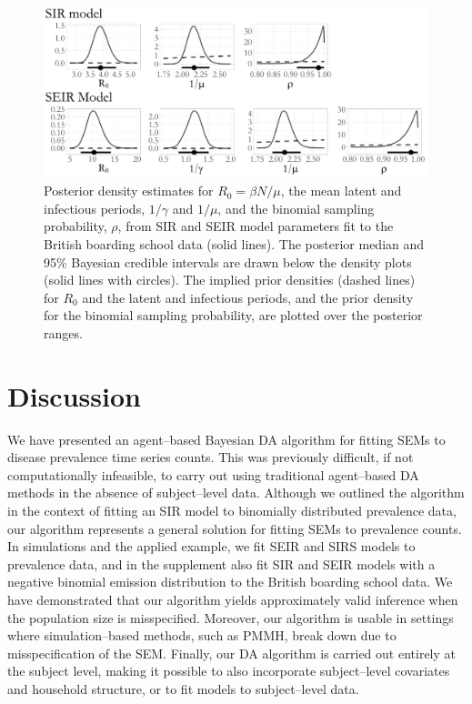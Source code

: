 \begin{figure}
	\centering
	\includegraphics[width=0.95\linewidth]{figures/bbs_densities.pdf}
	\caption{Posterior density estimates for $ R_0 = \beta N /\mu $, the mean latent and infectious periods, $ 1/\gamma $ and $ 1/\mu $, and the binomial sampling probability, $ \rho $, from SIR and SEIR model parameters fit to the British boarding school data (solid lines). The posterior median and 95\% Bayesian credible intervals are drawn below the density plots (solid lines with circles). The implied prior densities (dashed lines) for $ R_0 $ and the latent and infectious periods, and the prior density for the binomial sampling probability, are plotted over the posterior ranges.}
	\label{fig:bbs_densities}
\end{figure}

\section{Discussion}
\label{sec:bda_discussion}

We have presented an agent--based Bayesian DA algorithm for fitting SEMs to disease prevalence time series counts. This was previously difficult, if not computationally infeasible, to carry out using traditional agent--based DA methods in the absence of subject--level data. Although we outlined the algorithm in the context of fitting an SIR model to binomially distributed prevalence data, our algorithm represents a general solution for fitting SEMs to prevalence counts. In simulations and the applied example, we fit SEIR and SIRS models to prevalence data, and in the supplement also fit SIR and SEIR models with a negative binomial emission distribution to the British boarding school data. We have demonstrated that our algorithm yields approximately valid inference when the population size is misspecified. Moreover, our algorithm is usable in settings where simulation--based methods, such as PMMH, break down due to misspecification of the SEM. Finally, our DA algorithm is carried out entirely at the subject level, making it possible to also incorporate subject--level covariates and household structure, or to fit models to subject--level data. 

